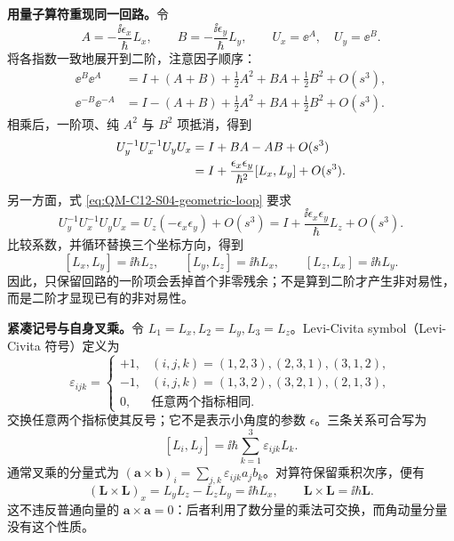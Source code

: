 \textbf{用量子算符重现同一回路。}令
\begin{equation}
  A=-\frac{\ii\epsilon_x}{\hbar}L_x,\qquad
  B=-\frac{\ii\epsilon_y}{\hbar}L_y,\qquad
  U_x=\ee^A,\quad U_y=\ee^B.
\end{equation}
将各指数一致地展开到二阶，注意因子顺序：
\begin{align}
  \ee^B\ee^A
  &=I+(A+B)+\frac12A^2+BA+\frac12B^2+O(s^3),\\
  \ee^{-B}\ee^{-A}
  &=I-(A+B)+\frac12A^2+BA+\frac12B^2+O(s^3).
\end{align}
相乘后，一阶项、纯 $A^2$ 与 $B^2$ 项抵消，得到
\begin{align}
  U_y^{-1}U_x^{-1}U_yU_x
  &=I+BA-AB+O(s^3)\notag\\
  &=I+\frac{\epsilon_x\epsilon_y}{\hbar^2}[L_x,L_y]+O(s^3).
\end{align}
另一方面，式 \eqref{eq:QM-C12-S04-geometric-loop} 要求
\begin{equation}
  U_y^{-1}U_x^{-1}U_yU_x
  =U_z(-\epsilon_x\epsilon_y)+O(s^3)
  =I+\frac{\ii\epsilon_x\epsilon_y}{\hbar}L_z+O(s^3).
\end{equation}
比较系数，并循环替换三个坐标方向，得到
\begin{equation}
  \boxed{[L_x,L_y]=\ii\hbar L_z,\qquad
    [L_y,L_z]=\ii\hbar L_x,\qquad
    [L_z,L_x]=\ii\hbar L_y.}
  \label{eq:QM-C12-S04-algebra}
\end{equation}
因此，只保留回路的一阶项会丢掉首个非零残余；不是算到二阶才产生非对易性，而是二阶才显现已有的非对易性。

\textbf{紧凑记号与自身叉乘。}令 $L_1=L_x,L_2=L_y,L_3=L_z$。Levi-Civita symbol（Levi-Civita 符号）定义为
\begin{equation}
  \varepsilon_{ijk}=
  \begin{cases}
    +1,&(i,j,k)=(1,2,3),(2,3,1),(3,1,2),\\
    -1,&(i,j,k)=(1,3,2),(3,2,1),(2,1,3),\\
    0,&\text{任意两个指标相同}.
  \end{cases}
\end{equation}
交换任意两个指标使其反号；它不是表示小角度的参数 $\epsilon$。三条关系可合写为
\begin{equation}
  \boxed{[L_i,L_j]=\ii\hbar\sum_{k=1}^3\varepsilon_{ijk}L_k.}
\end{equation}
通常叉乘的分量式为 $(\mathbf a\times\mathbf b)_i=\sum_{j,k}\varepsilon_{ijk}a_jb_k$。对算符保留乘积次序，便有
\begin{equation}
  (\mathbf L\times\mathbf L)_x=L_yL_z-L_zL_y=\ii\hbar L_x,
  \qquad \boxed{\mathbf L\times\mathbf L=\ii\hbar\mathbf L}.
\end{equation}
这不违反普通向量的 $\mathbf a\times\mathbf a=0$：后者利用了数分量的乘法可交换，而角动量分量没有这个性质。

